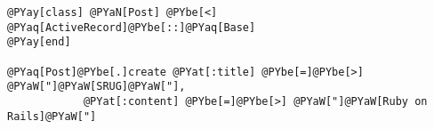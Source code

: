 \begin{Verbatim}[commandchars=@\[\]]
@PYay[class] @PYaN[Post] @PYbe[<] @PYaq[ActiveRecord]@PYbe[::]@PYaq[Base]
@PYay[end]

@PYaq[Post]@PYbe[.]create @PYat[:title] @PYbe[=]@PYbe[>] @PYaW["]@PYaW[SRUG]@PYaW["],
            @PYat[:content] @PYbe[=]@PYbe[>] @PYaW["]@PYaW[Ruby on Rails]@PYaW["]
\end{Verbatim}
